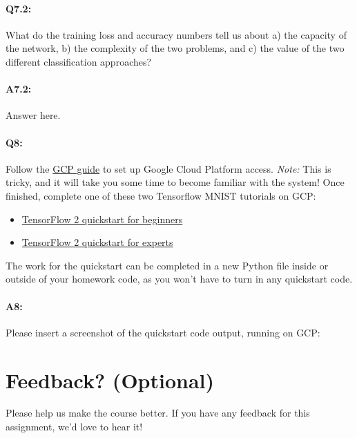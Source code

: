 \pagebreak
\paragraph{Q7.2:} What do the training loss and accuracy numbers tell us about a) the capacity of the network, b) the complexity of the two problems, and c) the value of the two different classification approaches?

\paragraph{A7.2:} Answer here.



\pagebreak
\paragraph{Q8:} Follow the \href{https://browncsci1430.github.io/webpage/resources/gcp_guide/}{GCP guide} to set up Google Cloud Platform access. 
\emph{Note:} This is tricky, and it will take you some time to become familiar with the system! 
Once finished, complete one of these two Tensorflow MNIST tutorials on GCP:
\begin{itemize}
	\item \href{https://www.tensorflow.org/tutorials/quickstart/beginner}{TensorFlow 2 quickstart for beginners}
	\item \href{https://www.tensorflow.org/tutorials/quickstart/advanced}{TensorFlow 2 quickstart for experts}
\end{itemize}

The work for the quickstart can be completed in a new Python file inside or outside of your homework code, as you won't have to turn in any quickstart code.


\paragraph{A8:} Please insert a screenshot of the quickstart code output, running on GCP:





\pagebreak
\section*{Feedback? (Optional)}
Please help us make the course better. If you have any feedback for this assignment, we'd love to hear it!





